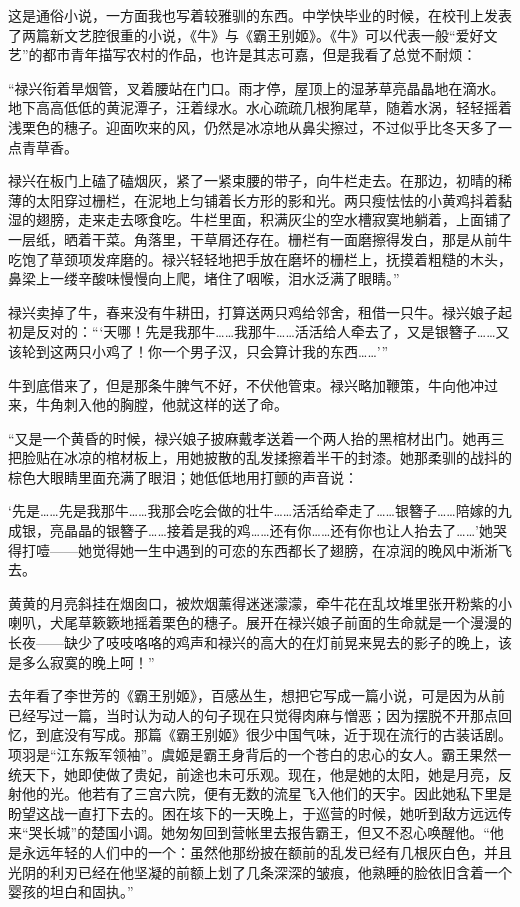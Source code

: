 \par 这是通俗小说，一方面我也写着较雅驯的东西。中学快毕业的时候，在校刊上发表了两篇新文艺腔很重的小说，《牛》与《霸王别姬》。《牛》可以代表一般“爱好文艺”的都市青年描写农村的作品，也许是其志可嘉，但是我看了总觉不耐烦：
\par “禄兴衔着旱烟管，叉着腰站在门口。雨才停，屋顶上的湿茅草亮晶晶地在滴水。地下高高低低的黄泥潭子，汪着绿水。水心疏疏几根狗尾草，随着水涡，轻轻摇着浅栗色的穗子。迎面吹来的风，仍然是冰凉地从鼻尖擦过，不过似乎比冬天多了一点青草香。
\par 禄兴在板门上磕了磕烟灰，紧了一紧束腰的带子，向牛栏走去。在那边，初晴的稀薄的太阳穿过栅栏，在泥地上匀铺着长方形的影和光。两只瘦怯怯的小黄鸡抖着黏湿的翅膀，走来走去啄食吃。牛栏里面，积满灰尘的空水槽寂寞地躺着，上面铺了一层纸，晒着干菜。角落里，干草屑还存在。栅栏有一面磨擦得发白，那是从前牛吃饱了草颈项发痒磨的。禄兴轻轻地把手放在磨坏的栅栏上，抚摸着粗糙的木头，鼻梁上一缕辛酸味慢慢向上爬，堵住了咽喉，泪水泛满了眼睛。”
\par 禄兴卖掉了牛，春来没有牛耕田，打算送两只鸡给邻舍，租借一只牛。禄兴娘子起初是反对的：“‘天哪！先是我那牛……我那牛……活活给人牵去了，又是银簪子……又该轮到这两只小鸡了！你一个男子汉，只会算计我的东西……’”
\par 牛到底借来了，但是那条牛脾气不好，不伏他管束。禄兴略加鞭策，牛向他冲过来，牛角刺入他的胸膛，他就这样的送了命。
\par “又是一个黄昏的时候，禄兴娘子披麻戴孝送着一个两人抬的黑棺材出门。她再三把脸贴在冰凉的棺材板上，用她披散的乱发揉擦着半干的封漆。她那柔驯的战抖的棕色大眼睛里面充满了眼泪；她低低地用打颤的声音说：
\par ‘先是……先是我那牛……我那会吃会做的壮牛……活活给牵走了……银簪子……陪嫁的九成银，亮晶晶的银簪子……接着是我的鸡……还有你……还有你也让人抬去了……’她哭得打噎——她觉得她一生中遇到的可恋的东西都长了翅膀，在凉润的晚风中淅淅飞去。
\par 黄黄的月亮斜挂在烟囱口，被炊烟薰得迷迷濛濛，牵牛花在乱坟堆里张开粉紫的小喇叭，犬尾草簌簌地摇着栗色的穗子。展开在禄兴娘子前面的生命就是一个漫漫的长夜——缺少了吱吱咯咯的鸡声和禄兴的高大的在灯前晃来晃去的影子的晚上，该是多么寂寞的晚上呵！”
\par 去年看了李世芳的《霸王别姬》，百感丛生，想把它写成一篇小说，可是因为从前已经写过一篇，当时认为动人的句子现在只觉得肉麻与憎恶；因为摆脱不开那点回忆，到底没有写成。那篇《霸王别姬》很少中国气味，近于现在流行的古装话剧。项羽是“江东叛军领袖”。虞姬是霸王身背后的一个苍白的忠心的女人。霸王果然一统天下，她即使做了贵妃，前途也未可乐观。现在，他是她的太阳，她是月亮，反射他的光。他若有了三宫六院，便有无数的流星飞入他们的天宇。因此她私下里是盼望这战一直打下去的。困在垓下的一天晚上，于巡营的时候，她听到敌方远远传来“哭长城”的楚国小调。她匆匆回到营帐里去报告霸王，但又不忍心唤醒他。“他是永远年轻的人们中的一个：虽然他那纷披在额前的乱发已经有几根灰白色，并且光阴的利刃已经在他坚凝的前额上划了几条深深的皱痕，他熟睡的脸依旧含着一个婴孩的坦白和固执。”
